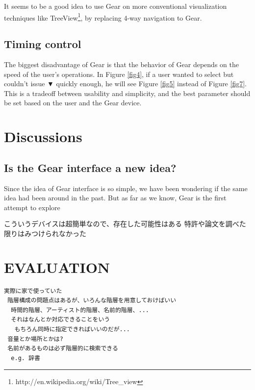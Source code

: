 \documentclass{article}
\def\down{▼}
\begin{document}

It seems to be a good idea to use Gear on more conventional visualization techniques like
TreeView\footnote{
  \textsf{http://en.wikipedia.org/wiki/Tree\_view}
}, by replacing 4-way navigation to Gear.


\subsection{Timing control}

The biggest disadvantage of Gear is that
the behavior of Gear depends on the speed of the user's operations.
In Figure \ref{fig4},
if a user wanted to select  but couldn't issue {\down}
quickly enough, he will see Figure \ref{fig5} instead of Figure \ref{fig7}.
This is a tradeoff between usability and simplicity, and
the best parameter should be set based on the user and the Gear device.

\section{Discussions}

\subsection{Is the Gear interface a new idea?}
  Since the idea of Gear interface is so simple, we have been wondering if the same idea had been around in the past.
  But as far as we know, Gear is the first attempt to explore 

 こういうデバイスは超簡単なので、存在した可能性はある
 特許や論文を調べた限りはみつけられなかった

\section*{EVALUATION}

\begin{verbatim}
実際に家で使っていた
 階層構成の問題点はあるが、いろんな階層を用意しておけばいい
  時間的階層、アーティスト的階層、名前的階層、...
  それはなんとか対応できることをいう
   もちろん同時に指定できればいいのだが...
 音量とか場所とかは?
 名前があるものは必ず階層的に検索できる
  e.g. 辞書
\end{verbatim}
\end{document}
